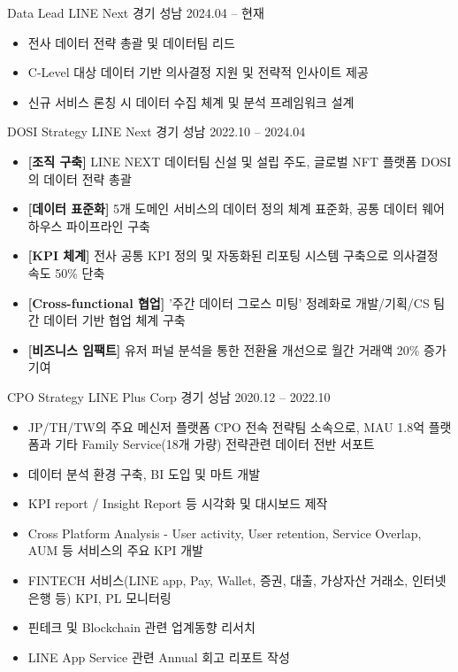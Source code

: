 \documentclass[11pt, a4paper]{awesome-cv}
\begin{document}
\begin{cventries}
  \cventry
    {Data Lead}
    {LINE Next}
    {경기 성남}
    {2024.04 -- 현재}
    {
      \begin{itemize}
        \item 전사 데이터 전략 총괄 및 데이터팀 리드
        \item C-Level 대상 데이터 기반 의사결정 지원 및 전략적 인사이트 제공
        \item 신규 서비스 론칭 시 데이터 수집 체계 및 분석 프레임워크 설계
      \end{itemize}
    }

  \cventry
    {DOSI Strategy}
    {LINE Next}
    {경기 성남}
    {2022.10 -- 2024.04}
    {
    \begin{itemize}
        \item \textbf{[조직 구축]} LINE NEXT 데이터팀 신설 및 설립 주도, 글로벌 NFT 플랫폼 DOSI의 데이터 전략 총괄
        \item \textbf{[데이터 표준화]} 5개 도메인 서비스의 데이터 정의 체계 표준화, 공통 데이터 웨어하우스 파이프라인 구축
        \item \textbf{[KPI 체계]} 전사 공통 KPI 정의 및 자동화된 리포팅 시스템 구축으로 의사결정 속도 50\% 단축
        \item \textbf{[Cross-functional 협업]} '주간 데이터 그로스 미팅' 정례화로 개발/기획/CS 팀 간 데이터 기반 협업 체계 구축
        \item \textbf{[비즈니스 임팩트]} 유저 퍼널 분석을 통한 전환율 개선으로 월간 거래액 20\% 증가 기여
      \end{itemize}
    }

  \cventry
    {CPO Strategy}
    {LINE Plus Corp}
    {경기 성남}
    {2020.12 -- 2022.10}
    {
      \begin{itemize}
        \item JP/TH/TW의 주요 메신저 플랫폼 CPO 전속 전략팀 소속으로, MAU 1.8억 플랫폼과 기타 Family Service(18개 가량) 전략관련 데이터 전반 서포트
        \item 데이터 분석 환경 구축, BI 도입 및 마트 개발
        \item KPI report / Insight Report 등 시각화 및 대시보드 제작
        \item Cross Platform Analysis - User activity, User retention, Service Overlap, AUM 등 서비스의 주요 KPI 개발
        \item FINTECH 서비스(LINE app, Pay, Wallet, 증권, 대출, 가상자산 거래소, 인터넷은행 등) KPI, PL 모니터링
        \item 핀테크 및 Blockchain 관련 업계동향 리서치
        \item LINE App Service 관련 Annual 회고 리포트 작성
      \end{itemize}
    }


\end{cventries}
\end{document}
